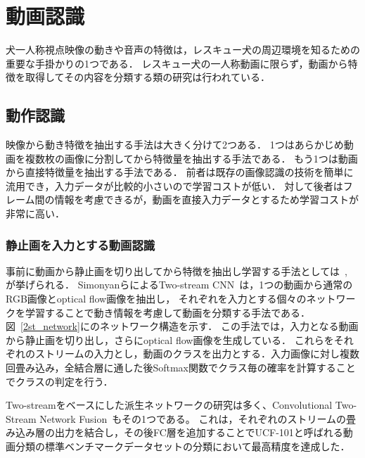 \section{動画認識}
犬一人称視点映像の動きや音声の特徴は，レスキュー犬の周辺環境を知るための重要な手掛かりの1つである．
レスキュー犬の一人称動画に限らず，動画から特徴を取得してその内容を分類する類の研究は行われている．
\subsection{動作認識}
映像から動き特徴を抽出する手法は大きく分けて2つある．
1つはあらかじめ動画を複数枚の画像に分割してから特徴量を抽出する手法である．
もう1つは動画から直接特徴量を抽出する手法である．
前者は既存の画像認識の技術を簡単に流用でき，入力データが比較的小さいので学習コストが低い．
対して後者はフレーム間の情報を考慮できるが，動画を直接入力データとするため学習コストが非常に高い．
\subsubsection{静止画を入力とする動画認識}
事前に動画から静止画を切り出してから特徴を抽出し学習する手法としては~\cite{simonyan2014two}, \cite{wang2015towards}が挙げられる．
SimonyanらによるTwo-stream CNN~\cite{simonyan2014two}は，1つの動画から通常のRGB画像とoptical flow画像を抽出し，
それぞれを入力とする個々のネットワークを学習することで動き情報を考慮して動画を分類する手法である．
図~\ref{2st_network}に\cite{simonyan2014two}のネットワーク構造を示す．
この手法では，入力となる動画から静止画を切り出し，さらにoptical flow画像を生成している．
これらをそれぞれのストリームの入力とし，動画のクラスを出力とする．入力画像に対し複数回畳み込み，全結合層に通した後Softmax関数でクラス毎の確率を計算することでクラスの判定を行う．

Two-streamをベースにした派生ネットワークの研究は多く、Convolutional Two-Stream Network Fusion~\cite{a}もその1つである。
これは，それぞれのストリームの畳み込み層の出力を結合し，その後FC層を追加することでUCF-101と呼ばれる動画分類の標準ベンチマークデータセットの分類において最高精度を達成した．

